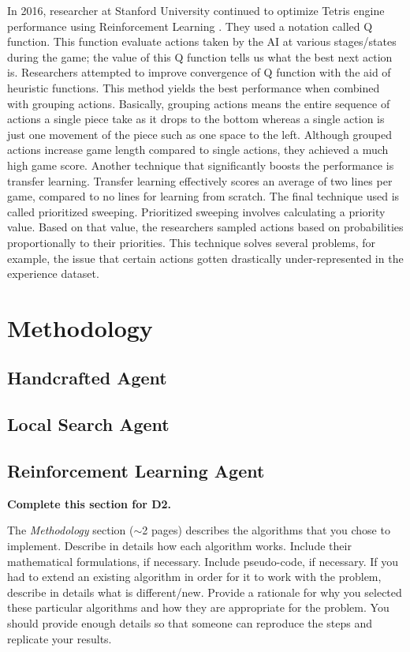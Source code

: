 \documentclass[letterpaper]{article} %
\begin{document}
In 2016, researcher at Stanford University continued to optimize Tetris engine performance using Reinforcement Learning \cite{s016}. They used a notation called Q function. This function evaluate actions taken by the AI at various stages/states during the game; the value of this Q function tells us what the best next action is. Researchers attempted to improve convergence of Q function with the aid of heuristic functions. This method yields the best performance when combined with grouping actions. Basically, grouping actions means the entire sequence of actions a single piece take as it drops to the bottom whereas a single action is just one movement of the piece such as one space to the left. Although grouped actions increase game length compared to single actions, they achieved a much high game score. Another technique that significantly boosts the performance is transfer learning. Transfer learning effectively scores an average of two lines per game, compared to no lines for learning from scratch. The final technique used is called prioritized sweeping. Prioritized sweeping involves calculating a priority value. Based on that value, the researchers sampled actions based on probabilities proportionally to their priorities. This technique solves several problems, for example, the issue that certain actions gotten drastically under-represented in the experience dataset.


\section{Methodology}

\subsection{Handcrafted Agent}
\subsection{Local Search Agent}
\subsection{Reinforcement Learning Agent}
{\bf Complete this section for D2.}

The {\it Methodology } section ($\sim$2 pages) describes the algorithms that you chose to implement.  Describe in details how each algorithm works.  Include their mathematical formulations, if necessary.  Include pseudo-code, if necessary.  If you had to extend an existing algorithm in order for it to work with the problem, describe in details what is different/new.  Provide a rationale for why you selected these particular algorithms and how they are appropriate for the problem.  You should provide enough details so that someone can reproduce the steps and replicate your results.  
\end{document}
